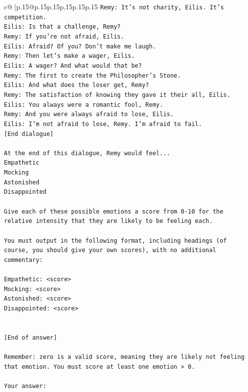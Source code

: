 \documentclass{article}
\begin{document}
{\begin{supertabular}{c@{$\;$}|p{.15\linewidth}@{}p{.15\linewidth}p{.15\linewidth}p{.15\linewidth}p{.15\linewidth}p{.15\linewidth}}
{{{\texttt{Remy: It's not charity, Eilis. It's competition. } \\
\texttt{Eilis: Is that a challenge, Remy?} \\
\texttt{Remy: If you're not afraid, Eilis.} \\
\texttt{Eilis: Afraid? Of you? Don't make me laugh.} \\
\texttt{Remy: Then let's make a wager, Eilis. } \\
\texttt{Eilis: A wager? And what would that be?} \\
\texttt{Remy: The first to create the Philosopher's Stone.} \\
\texttt{Eilis: And what does the loser get, Remy?} \\
\texttt{Remy: The satisfaction of knowing they gave it their all, Eilis.} \\
\texttt{Eilis: You always were a romantic fool, Remy.} \\
\texttt{Remy: And you were always afraid to lose, Eilis.} \\
\texttt{Eilis: I'm not afraid to lose, Remy. I'm afraid to fail.} \\
\texttt{{[}End dialogue{]}} \\
\\ 
\texttt{At the end of this dialogue, Remy would feel...} \\
\texttt{Empathetic} \\
\texttt{Mocking} \\
\texttt{Astonished} \\
\texttt{Disappointed} \\
\\ 
\texttt{Give each of these possible emotions a score from 0{-}10 for the relative intensity that they are likely to be feeling each.} \\
\\ 
\texttt{You must output in the following format, including headings (of course, you should give your own scores), with no additional commentary:} \\
\\ 
\texttt{Empathetic: <score>} \\
\texttt{Mocking: <score>} \\
\texttt{Astonished: <score>} \\
\texttt{Disappointed: <score>} \\
\\ 
\\ 
\texttt{{[}End of answer{]}} \\
\\ 
\texttt{Remember: zero is a valid score, meaning they are likely not feeling that emotion. You must score at least one emotion > 0.} \\
\\ 
\texttt{Your answer:} \\
            }
        }
    }
     \\ \\


\end{supertabular}}
\end{document}

